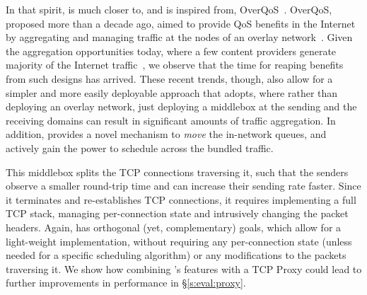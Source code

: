 In that spirit, \name is much closer to, and is inspired from, OverQoS~\cite{overqos}. OverQoS, proposed more than a decade ago, aimed to provide QoS benefits in the Internet by aggregating and managing traffic at the nodes of an overlay network~\cite{ron}. Given the aggregation opportunities today, where a few content providers generate majority of the Internet traffic~\cite{fivecomps}, we observe that the time for reaping benefits from such designs has arrived. These recent trends, though, also allow for a simpler and more easily deployable approach that \name adopts, where rather than deploying an overlay network, just deploying a middlebox at the sending and the receiving domains can result in significant amounts of traffic aggregation. In addition, \name provides a novel mechanism to \emph{move} the in-network queues, and actively gain the power to schedule across the bundled traffic. 








 This middlebox splits the TCP connections traversing it, such that the senders observe a smaller round-trip time and can increase their sending rate faster. Since it terminates and re-establishes TCP connections, it requires implementing a full TCP stack, managing per-connection state and intrusively changing the packet headers. Again, \name has orthogonal (yet, complementary) goals, which allow for a light-weight implementation, without requiring any per-connection state (unless needed for a specific scheduling algorithm) or any modifications to the packets traversing it. We show how combining \name's features with a TCP Proxy could lead to further improvements in performance in \S\ref{s:eval:proxy}. 


